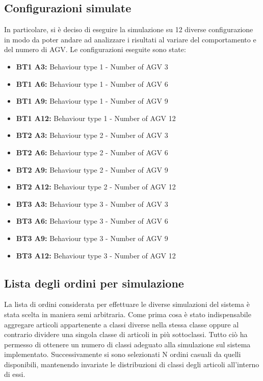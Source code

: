 \documentclass[12pt]{article}
\begin{document}
\subsection{Configurazioni simulate}
In particolare, si è deciso di eseguire la simulazione su 12 diverse configurazione in modo da poter andare ad analizzare i risultati al variare del comportamento e del numero di AGV. Le configurazioni eseguite sono state:
\begin{itemize}
\setlength\itemsep{0.1em}
    \item \textbf{BT1 A3:} Behaviour type 1 - Number of AGV 3 
    \item \textbf{BT1 A6:} Behaviour type 1 - Number of AGV 6 
    \item \textbf{BT1 A9:} Behaviour type 1 - Number of AGV 9
    \item \textbf{BT1 A12:} Behaviour type 1 - Number of AGV 12
    \vspace{0.3cm}
    \item \textbf{BT2 A3:} Behaviour type 2 - Number of AGV 3
    \item \textbf{BT2 A6:} Behaviour type 2 - Number of AGV 6 
    \item \textbf{BT2 A9:} Behaviour type 2 - Number of AGV 9 
    \item \textbf{BT2 A12:} Behaviour type 2 - Number of AGV 12 
    \vspace{0.3cm}
    \item \textbf{BT3 A3:} Behaviour type 3 - Number of AGV 3 
    \item \textbf{BT3 A6:} Behaviour type 3 - Number of AGV 6
    \item \textbf{BT3 A9:} Behaviour type 3 - Number of AGV 9 
    \item \textbf{BT3 A12:} Behaviour type 3 - Number of AGV 12 
    
\end{itemize}

\newpage

\subsection{Lista degli ordini per simulazione}
La lista di ordini considerata per effettuare le diverse simulazioni del sistema è stata scelta in maniera semi arbitraria. Come prima cosa è stato indispensabile aggregare articoli appartenente a classi diverse nella stessa classe oppure al contrario dividere una singola classe di articoli in più sottoclassi. Tutto ciò ha permesso di ottenere un numero di classi adeguato alla simulazione sul sistema implementato. \newline
Successivamente si sono selezionati N ordini casuali da quelli disponibili, mantenendo invariate le distribuzioni di classi degli articoli all'interno di essi.\\
\end{document}
